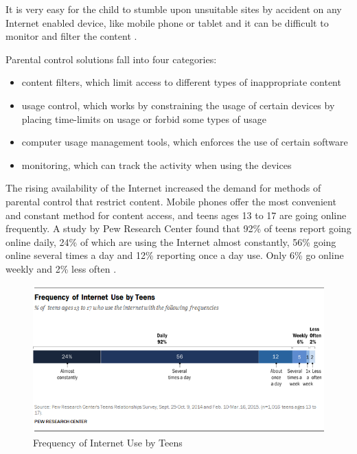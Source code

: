 It is very easy for the child to stumble upon unsuitable sites by accident on any Internet enabled device, like mobile phone or tablet and it can be difficult to monitor and filter the content \citep{innapropriateContent}.

Parental control solutions fall into four categories:

\begin{itemize}
\item content filters, which limit access to different types of inappropriate content
\item usage control, which works by constraining the usage of certain devices by placing time-limits on usage or forbid some types of usage
\item computer usage management tools, which enforces the use of certain software
\item monitoring, which can track the activity when using the devices
\end{itemize}

The rising availability of the Internet increased the demand for methods of parental control that restrict content. Mobile phones offer the most convenient and constant method for content access, and teens ages 13 to 17 are going online frequently. A study by Pew Research Center found that 92\% of teens report going online daily, 24\% of which are using the Internet almost constantly, 56\% going online several times a day and 12\% reporting once a day use. Only 6\% go online weekly and 2\% less often \citep{lenhart2015teens}.

\begin{figure}[th]
\centering
\includegraphics[width=1\textwidth]{Figures/frequency-of-internet-use-by-teens}
\decoRule
\caption[Frequency of Internet Use by Teens]{Frequency of Internet Use by Teens}
\label{fig:frequency-of-internet-use-by-teens}
\end{figure}

